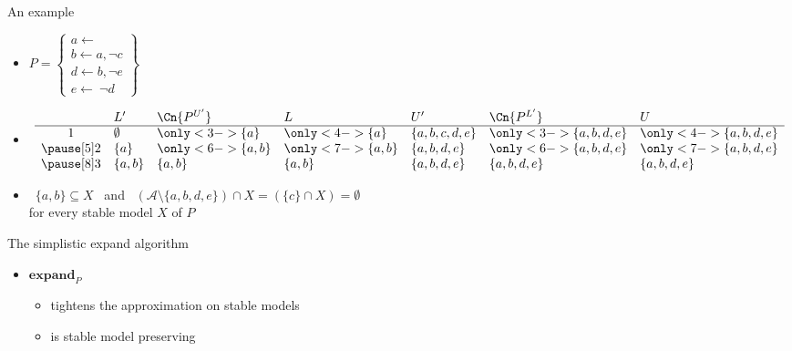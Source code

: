 \begin{frame}{An example}
  \begin{itemize}
  \item<1-> []
    \(
    P
    =
    \left\{
      \begin{array}{l}
        a\leftarrow\\  b\leftarrow a,\neg c\\ d\leftarrow b,\neg e\\ e\leftarrow~\neg d
      \end{array}
    \right\}
    \)
    \smallskip
  \item<2-> []
    \[
      \begin{array}{cllllll}
         & L'                & \Cn{P^{U'}}      & L                & U'                     & \Cn{P^{L'}}          & U                    \\
        \hline
        1&          \emptyset&\only<3->{\{a  \}}&\only<4->{\{a  \}}&          \{a,b,c,d,e\} &\only<3->{\{a,b,d,e\}}&\only<4->{\{a,b,d,e\}}\\\pause[5]
        2&          \{a  \}  &\only<6->{\{a,b\}}&\only<7->{\{a,b\}}&          \{a,b,  d,e\} &\only<6->{\{a,b,d,e\}}&\only<7->{\{a,b,d,e\}}\\\pause[8]
        3&          \{a,b\}  &          \{a,b\} &          \{a,b\} &          \{a,b,  d,e\} &          \{a,b,d,e\} &          \{a,b,d,e\}
      \end{array}
    \]
    \medskip
  \item<9->  \ $\{a,b\}\subseteq X$ \ and \
    $(\mathcal{A}\setminus\{a,b,d,e\})\cap X= (\{c\}\cap X)=\emptyset$
    \\
    for every stable model $X$ of $P$
  \end{itemize}
\end{frame}
\begin{frame}{The simplistic expand algorithm}
  \bigskip
  \begin{itemize}
  \item $\mathbf{expand}_{P}$
  \begin{itemize}\normalsize
  \item tightens the approximation on stable models
  \item is stable model preserving
  \end{itemize}
\end{itemize}
\end{frame}
